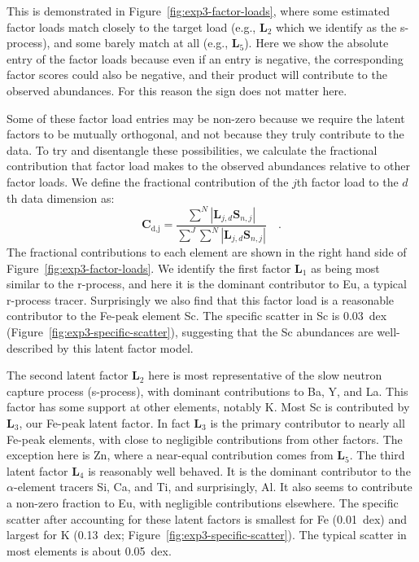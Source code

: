 \documentclass[twocolumn]{aastex62}
\newcommand{\factorloads}{\textbf{L}}
\newcommand{\factorscores}{\textbf{S}}
\begin{document}
This is demonstrated in Figure~\ref{fig:exp3-factor-loads}, where some estimated factor loads match
closely to the target load (e.g., $\mathbf{L}_2$ which we identify as the s-process), and some barely
match at all (e.g., $\mathbf{L}_5$). Here we show the absolute entry of the factor loads because even
if an entry is negative, the corresponding factor scores could also be negative, and their product will contribute to the observed abundances. For this reason the sign does not matter here.

Some of these factor load entries may be non-zero because we require the latent factors to
be mutually orthogonal, and not because they truly contribute to the data. To try and
disentangle these possibilities, we calculate the fractional contribution that factor
load makes to the observed abundances relative to other factor loads. We define the
fractional contribution of the $j$th factor load to the $d$th
data dimension as:
\begin{equation}
	\mathbf{C}_\textrm{d,j} = \frac{\sum^{N}|\factorloads_{j,d}\factorscores_{n,j}|}{\sum^J\sum^{N}|\factorloads_{j,d}\factorscores_{n,j}|} \quad .
\end{equation}
The fractional contributions to each element are shown in the right hand side of
Figure~\ref{fig:exp3-factor-loads}. We identify the first factor $\mathbf{L}_1$ 
as being most similar to the r-process, and here it is the dominant contributor to Eu, a typical r-process tracer. Surprisingly we also find that this factor load is a reasonable  contributor to the Fe-peak element Sc. The specific scatter in Sc is 0.03~dex (Figure~\ref{fig:exp3-specific-scatter}), suggesting that the Sc abundances are well-described by this latent factor model.
 

The second latent factor $\mathbf{L}_2$ here is most representative of the slow neutron capture process (s-process), with dominant contributions to Ba, Y, and La. This factor has some support at other elements, notably K. Most Sc is contributed by $\mathbf{L}_3$, our Fe-peak latent factor. In fact $\mathbf{L}_3$ is the primary contributor to nearly all Fe-peak elements, with close to negligible contributions from other factors. The exception here is Zn, where a near-equal contribution comes from $\mathbf{L}_5$.
The third latent factor $\mathbf{L}_4$ is reasonably well behaved. It is the dominant contributor to the $\alpha$-element tracers Si, Ca, and Ti, and surprisingly, Al. It also seems to contribute a non-zero fraction to Eu, with negligible contributions elsewhere.
The specific scatter after accounting for these latent factors is smallest
for Fe (0.01~dex) and largest for K (0.13~dex; Figure~\ref{fig:exp3-specific-scatter}). The typical scatter in most elements is about 0.05~dex.
\end{document}
